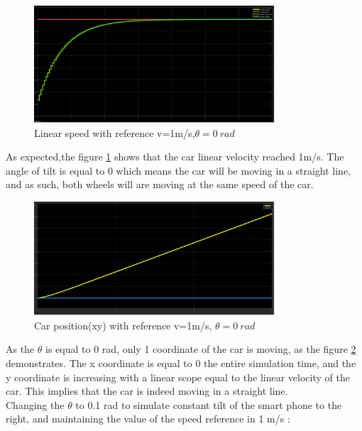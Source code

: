 \begin{figure}[!h]
\centering
\includegraphics[width=0.8\textwidth]{./img/vel10.png}
\caption {\label{fig:sim1 - vel}Linear speed with reference v=1m/s,$\theta = 0~\si{rad}$}
\end{figure}
 As expected,the figure \ref{fig:sim1 - vel} shows that the car linear velocity reached 1m/s. The angle of tilt is equal to 0 which means the car will be moving in a straight line, and as such, both wheels will are moving at the same speed of the car.\\
\newpage
\begin{figure}[!h]
\centering
\includegraphics[width=0.8\textwidth]{./img/xy10.png}
\caption {\label{fig:sim1 - pos}Car position(xy) with reference v=1m/s, $\theta = 0~\si{rad}$}
\end{figure}
As the $\theta$ is equal to 0 rad, only 1 coordinate of the car is moving, as the figure \ref{fig:sim1 - pos} demonstrates. The x coordinate is equal to 0 the entire simulation time, and the y coordinate is increasing with a linear scope equal to the linear velocity of the car. This implies that the car is indeed moving in a straight line.\\
Changing the $\theta$ to 0.1 rad to simulate constant tilt of the smart phone to the right, and maintaining the value of the speed reference in 1 m/s :\



